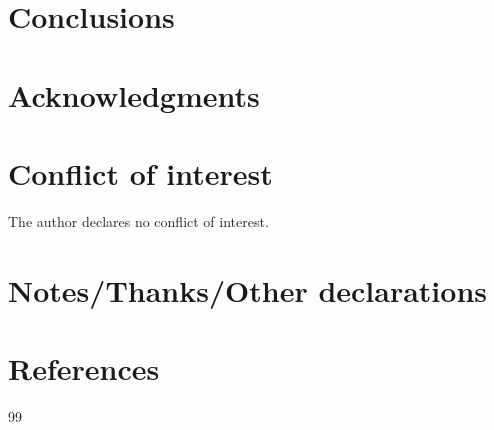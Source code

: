 \documentclass[numbers]{IntechOpen-Book}
\begin{document}
\begin{backmatter}

\section{Conclusions}


\section*{Acknowledgments}


\section*{Conflict of interest}
The author declares no conflict of interest.

\section*{Notes/Thanks/Other declarations}


\section*{References}


\begin{thebibliography}{99}


\end{thebibliography}

\end{backmatter}
\end{document}
